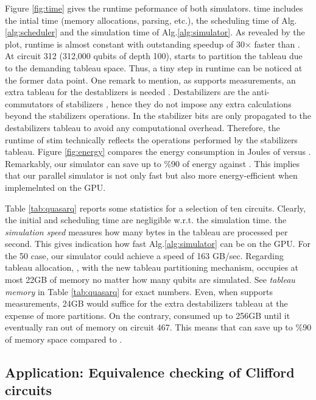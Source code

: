 \documentclass[runningheads]{llncs}
\begin{document}
Figure \ref{fig:time} gives the runtime peformance of both simulators. \quasarq time includes the intial time (memory allocations, parsing, etc.), the scheduling time of Alg.\ref{alg:scheduler} and the simulation time of Alg.\ref{alg:simulator}. As revealed by the plot, \quasarq runtime is almost constant with outstanding speedup of 30$\times$ faster than \stim. At circuit 312 (312,000 qubits of depth 100), \quasarq starts to partition the tableau due to the demanding tableau space. Thus, a tiny step in runtime can be noticed at the former data point.  One remark to mention, as \stim supports measurements, an extra tableau for the destablizers is needed \cite{stim, aaronson2008improved}. Destabilizers are the anti-commutators of stabilizers  \cite{aaronson2008improved}, hence they do not impose any extra calculations beyond the stabilizers operations. In \stim the stabilizer bits are only propagated to the destabilizers tableau to avoid any computational overhead. Therefore, the runtime of stim technically reflects the operations performed by the stabilizers tableau.
Figure \ref{fig:energy} compares the energy consumption in Joules of \quasarq versus \stim. Remarkably, our simulator can save up to \%90 of energy against \stim. This implies that our parallel simulator is not only fast but also more energy-efficient when implemelnted on the GPU.

Table \ref{tab:quasarq} reports some statistics for a selection of ten circuits. Clearly, the initial and scheduling time are negligible w.r.t. the simulation time. the \emph{simulation speed} measures how many bytes in the tableau are processed per second. This gives indication how fast Alg.\ref{alg:simulator} can be on the GPU. For the 50 case, our simulator could achieve a speed of 163 GB/sec.
Regarding tableau allocation, \quasarq, with the new tableau partitioning mechanism, occupies at most 22GB of memory no matter how many qubits are simulated. See \emph{tableau memory} in Table \ref{tab:quasarq} for exact numbers. Even, when \quasarq supports measurements, 24GB would suffice for the extra destabilizers tableau at the expense of more partitions.
On the contrary, \stim consumed up to 256GB until it eventually ran out of memory on circuit 467. This means that \quasarq can save up to \%90 of memory space compared to \stim.



\subsection{Application: Equivalence checking of Clifford circuits}
\end{document}
